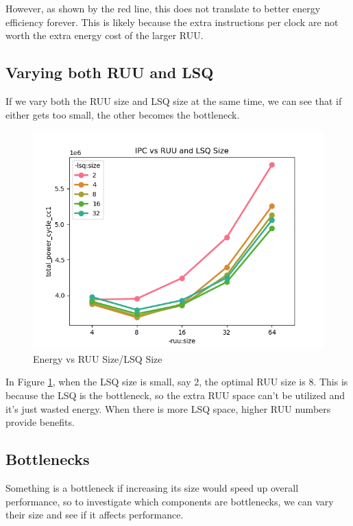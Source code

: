 \documentclass{article}
\begin{document}
\begin{multicols}{2}
  However, as shown by the red line, this does not translate to better energy efficiency forever. This is likely because the extra instructions per clock are not worth the extra energy cost of the larger RUU.

  \subsection{Varying both RUU and LSQ}
  If we vary both the RUU size and LSQ size at the same time, we can see that if either gets too small, the other becomes the bottleneck.

  \begin{figure}[H]
    \centering
    \includegraphics[width=\linewidth]{./assets/energy_vs_ruu_and_lsq_size.png}
    \caption{Energy vs RUU Size/LSQ Size}
    \label{fig:energy_vs_ruu_lsq}
  \end{figure}

  In Figure \ref{fig:energy_vs_ruu_lsq}, when the LSQ size is small, say 2, the optimal RUU size is 8. This is because the LSQ is the bottleneck, so the extra RUU space can't be utilized and it's just wasted energy. When there is more LSQ space, higher RUU numbers provide benefits.

  \subsection{Bottlenecks}
  Something is a bottleneck if increasing its size would speed up overall performance, so to investigate which components are bottlenecks, we can vary their size and see if it affects performance.


\end{multicols}
\end{document}
